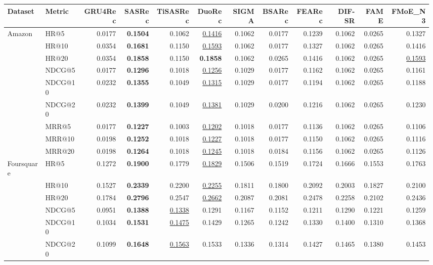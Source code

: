 \begin{tabular}{llrrrrrrrrrr}
\hline
Dataset & Metric & GRU4Rec & SASRec & TiSASRec & DuoRec & SIGMA & BSARec & FEARec & DIF-SR & FAME & FMoE\_N3 \\
\hline
Amazon & HR@5 & 0.0177 & \textbf{0.1504} & 0.1062 & \underline{0.1416} & 0.1062 & 0.0177 & 0.1239 & 0.1062 & 0.0265 & 0.1327 \\
 & HR@10 & 0.0354 & \textbf{0.1681} & 0.1150 & \underline{0.1593} & 0.1062 & 0.0177 & 0.1327 & 0.1062 & 0.0265 & 0.1416 \\
 & HR@20 & 0.0354 & \textbf{0.1858} & 0.1150 & \textbf{0.1858} & 0.1062 & 0.0265 & 0.1416 & 0.1062 & 0.0265 & \underline{0.1593} \\
 & NDCG@5 & 0.0177 & \textbf{0.1296} & 0.1018 & \underline{0.1256} & 0.1029 & 0.0177 & 0.1162 & 0.1062 & 0.0265 & 0.1161 \\
 & NDCG@10 & 0.0232 & \textbf{0.1355} & 0.1049 & \underline{0.1315} & 0.1029 & 0.0177 & 0.1194 & 0.1062 & 0.0265 & 0.1188 \\
 & NDCG@20 & 0.0232 & \textbf{0.1399} & 0.1049 & \underline{0.1381} & 0.1029 & 0.0200 & 0.1216 & 0.1062 & 0.0265 & 0.1230 \\
 & MRR@5 & 0.0177 & \textbf{0.1227} & 0.1003 & \underline{0.1202} & 0.1018 & 0.0177 & 0.1136 & 0.1062 & 0.0265 & 0.1106 \\
 & MRR@10 & 0.0198 & \textbf{0.1252} & 0.1018 & \underline{0.1227} & 0.1018 & 0.0177 & 0.1150 & 0.1062 & 0.0265 & 0.1116 \\
 & MRR@20 & 0.0198 & \textbf{0.1264} & 0.1018 & \underline{0.1245} & 0.1018 & 0.0184 & 0.1156 & 0.1062 & 0.0265 & 0.1126 \\
\hline
Foursquare & HR@5 & 0.1272 & \textbf{0.1900} & 0.1779 & \underline{0.1829} & 0.1506 & 0.1519 & 0.1724 & 0.1666 & 0.1553 & 0.1763 \\
 & HR@10 & 0.1527 & \textbf{0.2339} & 0.2200 & \underline{0.2255} & 0.1811 & 0.1800 & 0.2092 & 0.2003 & 0.1827 & 0.2100 \\
 & HR@20 & 0.1784 & \textbf{0.2796} & 0.2547 & \underline{0.2662} & 0.2087 & 0.2081 & 0.2478 & 0.2258 & 0.2102 & 0.2436 \\
 & NDCG@5 & 0.0951 & \textbf{0.1388} & \underline{0.1338} & 0.1291 & 0.1167 & 0.1152 & 0.1211 & 0.1290 & 0.1221 & 0.1259 \\
 & NDCG@10 & 0.1034 & \textbf{0.1531} & \underline{0.1475} & 0.1429 & 0.1265 & 0.1242 & 0.1330 & 0.1400 & 0.1310 & 0.1368 \\
 & NDCG@20 & 0.1099 & \textbf{0.1648} & \underline{0.1563} & 0.1533 & 0.1336 & 0.1314 & 0.1427 & 0.1465 & 0.1380 & 0.1453 \\

\end{tabular}

